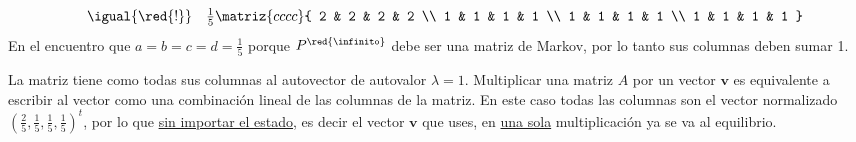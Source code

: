 \begin{enumerate}[label=(\alph*)]
$$\begin{array}{rcl}
                        & \igual{\red{!}}   &
            \frac{1}{5}
            \matriz{cccc}{
            2           & 2                 & 2           & 2           \\
            1           & 1                 & 1           & 1           \\
            1           & 1                 & 1           & 1           \\
            1           & 1                 & 1           & 1
            }
          \end{array}
        $$
        En el \red{!!!} encuentro que $a = b = c = d = \frac{1}{5}$ porque $P^{\red{\infinito}}$ debe ser una matriz de Markov, por
        lo tanto sus columnas deben sumar 1.

        La matriz tiene como todas sus columnas al autovector de autovalor $\lambda = 1$. Multiplicar una matriz $A$ por un vector
        $\bm{v}$ es equivalente a escribir al vector como una combinación lineal de las columnas de la matriz. En este caso
        todas las columnas son el vector normalizado $(\frac{2}{5},\frac{1}{5},\frac{1}{5},\frac{1}{5})^t$,
        por lo que \underline{sin importar el estado}, es decir el vector $\bm{v}$ que uses, en \underline{una sola} multiplicación ya
        se va al equilibrio.

        \bigskip


\end{enumerate}
